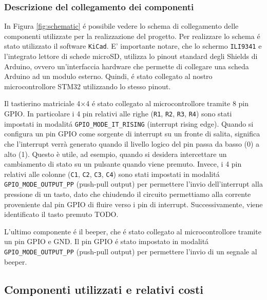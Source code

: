 \documentclass[a4paper]{article}
\begin{document}
\subsubsection{Descrizione del collegamento dei componenti}

In Figura \ref{fig:schematic} é possibile vedere lo schema di collegamento
delle componenti utilizzate per la realizzazione del progetto. Per realizzare lo schema é stato utilizzato il software \texttt{KiCad}. E' importante notare, che lo schermo \texttt{ILI9341} e l'integrato lettore di schede microSD, utilizza lo pinout standard degli Shields di Arduino, ovvero un'interfaccia hardware che permette di collegare una scheda Arduino ad un modulo esterno. Quindi, é stato collegato al nostro microcontrollore STM32 utilizzando lo stesso pinout.

Il tastierino matriciale 4$\times$4 é stato collegato al microcontrollore tramite 8 pin GPIO. In particolare i 4 pin relativi alle righe (\texttt{R1}, \texttt{R2}, \texttt{R3}, \texttt{R4}) sono stati impostati in modalitá \texttt{GPIO\_MODE\_IT\_RISING} (interrupt rising edge). Quando si configura un pin GPIO come sorgente di interrupt su un fronte di salita, significa che l'interrupt verrà generato quando il livello logico del pin passa da basso (0) a alto (1). Questo è utile, ad esempio, quando si desidera intercettare un cambiamento di stato su un pulsante quando viene premuto. Invece, i 4 pin relativi alle colonne (\texttt{C1}, \texttt{C2}, \texttt{C3}, \texttt{C4}) sono stati impostati in modalitá \texttt{GPIO\_MODE\_OUTPUT\_PP} (push-pull output) per permettere l'invio dell'interrupt alla pressione di un tasto, dato che chiudendo il circuito permettiamo alla corrente proveniente dal pin GPIO di fluire verso i pin di interrupt. Successivamente, viene identificato il tasto premuto TODO.

L'ultimo componente é il beeper, che é stato collegato al microcontrollore tramite un pin GPIO e GND. Il pin GPIO é stato impostato in modalitá \texttt{GPIO\_MODE\_OUTPUT\_PP} (push-pull output) per permettere l'invio di un segnale al beeper.


\subsection{Componenti utilizzati e relativi costi}
\end{document}
